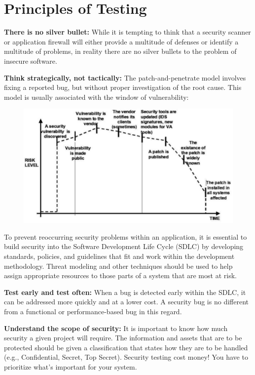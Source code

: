 		\clearpage
		\section{Principles of Testing}

			{\bf There is no silver bullet: } While it is tempting to think that a security 
			scanner or application firewall will either provide a multitude of defenses or
			identify a multitude of problems, in reality there are no silver bullets to the 
			problem of insecure software.

			{\bf Think strategically, not tactically: } The patch-and-penetrate model involves
			fixing a reported bug, but without proper investigation of the root cause. 
			This model is usually associated with the window of vulnerability:

				\begin{figure}[H]
					\includegraphics[scale=0.7]{pics/windowOfExposure.png}
				\end{figure}


			To prevent reoccurring security problems within an application, it is essential 
			to build security into the Software Development Life Cycle (SDLC) by developing
			standards, policies, and guidelines that fit and work within the development
			methodology. Threat modeling and other techniques should be used to help assign
			appropriate resources to those parts of a system that are most at risk.


			{\bf Test early and test often: } When a bug is detected early within the SDLC, 
			it can be addressed more quickly and at a lower cost. A security bug is no
			different from a functional or performance-based bug in this regard.


			{\bf Understand the scope of security:} It is important to know how much security 
			a given project will require. The information and assets that are to be protected
			should be given a classification that states how they are to be handled (e.g., Confidential, Secret, Top Secret). Security testing cost money! You have to
			prioritize what's important for your system. 

